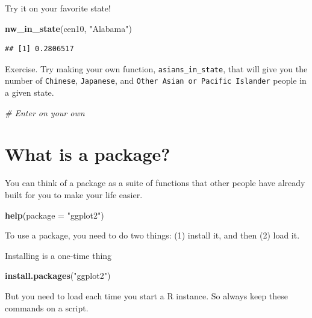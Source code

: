 \documentclass[]{book}
\newenvironment{Shaded}{\begin{snugshade}}{\end{snugshade}}
\newcommand{\KeywordTok}[1]{\textcolor[rgb]{0.13,0.29,0.53}{\textbf{#1}}}
\newcommand{\DataTypeTok}[1]{\textcolor[rgb]{0.13,0.29,0.53}{#1}}
\newcommand{\StringTok}[1]{\textcolor[rgb]{0.31,0.60,0.02}{#1}}
\newcommand{\CommentTok}[1]{\textcolor[rgb]{0.56,0.35,0.01}{\textit{#1}}}
\newcommand{\NormalTok}[1]{#1}
\theoremstyle{definition}
\theoremstyle{definition}
\theoremstyle{definition}
\theoremstyle{remark}
\begin{document}
Try it on your favorite state!

\begin{Shaded}
\begin{Highlighting}[]
\KeywordTok{nw_in_state}\NormalTok{(cen10, }\StringTok{"Alabama"}\NormalTok{)}
\end{Highlighting}
\end{Shaded}

\begin{verbatim}
## [1] 0.2806517
\end{verbatim}

Exercise. Try making your own function, \texttt{asians\_in\_state}, that
will give you the number of \texttt{Chinese}, \texttt{Japanese}, and
\texttt{Other\ Asian\ or\ Pacific\ Islander} people in a given state.

\begin{Shaded}
\begin{Highlighting}[]
\CommentTok{# Enter on your own}
\end{Highlighting}
\end{Shaded}

\section{What is a package?}\label{what-is-a-package}

You can think of a package as a suite of functions that other people
have already built for you to make your life easier.

\begin{Shaded}
\begin{Highlighting}[]
\KeywordTok{help}\NormalTok{(}\DataTypeTok{package =} \StringTok{"ggplot2"}\NormalTok{)}
\end{Highlighting}
\end{Shaded}

To use a package, you need to do two things: (1) install it, and then
(2) load it.

Installing is a one-time thing

\begin{Shaded}
\begin{Highlighting}[]
\KeywordTok{install.packages}\NormalTok{(}\StringTok{"ggplot2"}\NormalTok{)}
\end{Highlighting}
\end{Shaded}

But you need to load each time you start a R instance. So always keep
these commands on a script.
\end{document}
